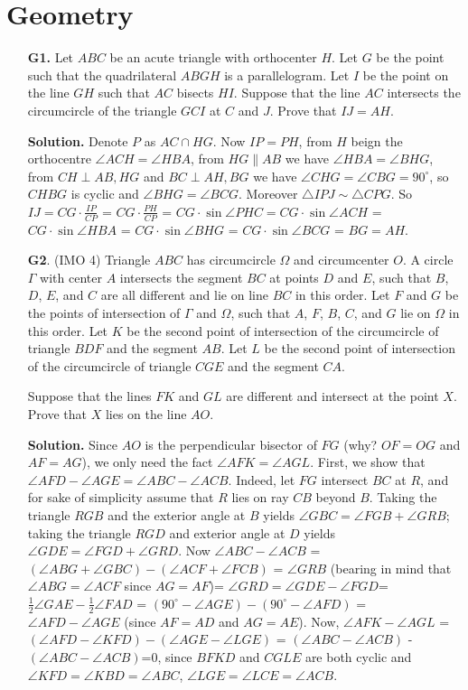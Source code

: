 \documentclass[11pt,a4paper]{article}
\begin{document}
\section*{Geometry}
\begin{enumerate}
\item[\textbf{G1.}] Let $ABC$ be an acute triangle with orthocenter $H$. Let $G$ be the point such that the quadrilateral $ABGH$ is a parallelogram. Let $I$ be the point on the line $GH$ such that $AC$ bisects $HI$. Suppose that the line $AC$ intersects the circumcircle of the triangle $GCI$ at $C$ and $J$. Prove that $IJ = AH$.

\textbf{Solution.} Denote $P$ as $AC\cap HG$. Now $IP=PH$, from $H$ beign the orthocentre $\angle ACH=\angle HBA$, from $HG\parallel AB$ we have $\angle HBA=\angle BHG$, from $CH\perp AB, HG$ and $BC\perp AH, BG$ we have $\angle CHG=\angle CBG=90^{\circ}$, so $CHBG$ is cyclic and $\angle BHG=\angle BCG$. Moreover $\triangle IPJ\sim\triangle CPG$. So $IJ=CG\cdot\frac{IP}{CP}$ = $CG\cdot\frac{PH}{CP}$ = $CG\cdot\sin\angle PHC=CG\cdot\sin\angle ACH$ = $CG\cdot\sin\angle HBA$ = $CG\cdot\sin\angle BHG$ = $CG\cdot\sin\angle BCG$ = $BG=AH$.

\item[\textbf{G2}.] (IMO 4) Triangle $ABC$ has circumcircle $\Omega$ and circumcenter $O$. A circle $\Gamma$ with center $A$ intersects the segment $BC$ at points $D$ and $E$, such that $B$, $D$, $E$, and $C$ are all different and lie on line $BC$ in this order. Let $F$ and $G$ be the points of intersection of $\Gamma$ and $\Omega$, such that $A$, $F$, $B$, $C$, and $G$ lie on $\Omega$ in this order. Let $K$ be the second point of intersection of the circumcircle of triangle $BDF$ and the segment $AB$. Let $L$ be the second point of intersection of the circumcircle of triangle $CGE$ and the segment $CA$.

Suppose that the lines $FK$ and $GL$ are different and intersect at the point $X$. Prove that $X$ lies on the line $AO$.

\textbf{Solution.} Since $AO$ is the perpendicular bisector of $FG$ (why? $OF=OG$ and $AF=AG$), we only need the fact $\angle AFK=\angle AGL$. First, we show that $\angle AFD-\angle AGE=\angle ABC-\angle ACB$. Indeed, let $FG$ intersect $BC$ at $R$, and for sake of simplicity assume that $R$ lies on ray $CB$ beyond $B$. Taking the triangle $RGB$ and the exterior angle at $B$ yields $\angle GBC=\angle FGB+\angle GRB$; taking the triangle $RGD$ and exterior angle at $D$ yields $\angle GDE=\angle FGD+\angle GRD$. Now $\angle ABC-\angle ACB$ = $(\angle ABG+\angle GBC)-(\angle ACF+\angle FCB)$ = $\angle GRB$ (bearing in mind that $\angle ABG=\angle ACF$ since $AG=AF$)= $\angle GRD=\angle GDE-\angle FGD$= $\frac{1}{2}\angle GAE-\frac 12\angle FAD$ = $(90^{\circ}-\angle AGE)-(90^{\circ}-\angle AFD)$ = $\angle AFD-\angle AGE$ (since $AF=AD$ and $AG=AE$). Now, $\angle AFK-\angle AGL$ = $(\angle AFD-\angle KFD)-(\angle AGE-\angle LGE)$ = $(\angle ABC-\angle ACB)$ - $(\angle ABC-\angle ACB)$=0, since $BFKD$ and $CGLE$ are both cyclic and $\angle KFD=\angle KBD=\angle ABC$, $\angle LGE=\angle LCE=\angle ACB$.


\end{enumerate}
\end{document}
